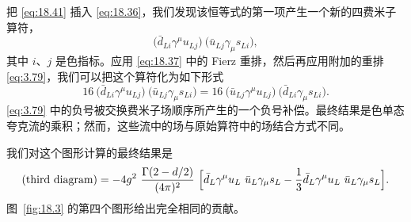 把 \eqref{eq:18.41} 插入 \eqref{eq:18.36}，我们发现该恒等式的第一项产生一个新的四费米子算符，
\begin{equation}
  \bigl( \bar{d}_{Li}\gamma^\mu u_{Lj} \bigr)\ \bigl( \bar{u}_{Lj}
    \gamma_\mu s_{Li} \bigr) ,
  \label{eq:18.42}
\end{equation}
其中 $i$、$j$ 是色指标。应用 \eqref{eq:18.37} 中的 Fierz 重排，然后再应用附加的重排 \eqref{eq:3.79}，我们可以把这个算符化为如下形式
\begin{equation}
  16\ \bigl( \bar{d}_{Li}\gamma^\mu u_{Lj} \bigr)\ \bigl( \bar{u}_{Lj}
    \gamma_\mu s_{Li} \bigr) = 16\ \bigl( \bar{u}_{Lj}\gamma^\mu u_{Lj}
    \bigr)\ \bigl( \bar{d}_{Li}\gamma_\mu s_{Li} \bigr) .
  \label{eq:18.43}
\end{equation}
\eqref{eq:3.79} 中的负号被交换费米子场顺序所产生的一个负号补偿。最终结果是色单态夸克流的乘积；然而，这些流中的场与原始算符中的场结合方式不同。

我们对这个图形计算的最终结果是
\begin{equation}
  \text{(third diagram)} = -4g^2\ \frac{\Gamma(2-d/2)}{(4\pi)^2}\ \Bigl[
    \bar{d}_L\gamma^\mu u_L\ \bar{u}_L\gamma_\mu s_L
    - \frac{1}{3}\bar{d}_L\gamma^\mu u_L\ \bar{u}_L\gamma_\mu s_L
    \Bigr] .
  \label{eq:18.44}
\end{equation}
图~\ref{fig:18.3} 的第四个图形给出完全相同的贡献。

